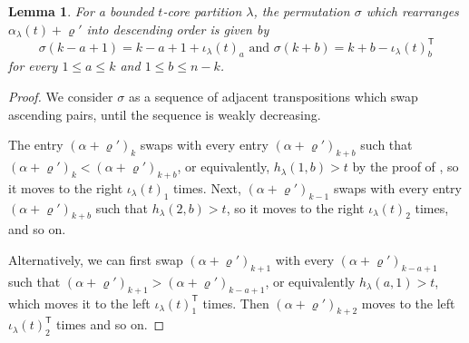 \documentclass{amsart}
\newcommand\T{\mathsf{T}}
\theoremstyle{plain}
\newtheorem{lemma}[lemma]{Lemma}
\theoremstyle{definition}
\numberwithin{equation}{section}
\begin{document}
\begin{lemma}\label{lem:sigma}
For a bounded $t$-core partition $\lambda$, the permutation $\sigma$ which rearranges $\alpha_\lambda(t)+\varrho'$ into descending order is given by
\[\sigma(k-a+1)=k-a+1+\iota_\lambda(t)_a\text{ and }\sigma(k+b)=k+b-\iota_\lambda(t)_b^\T\]
for every $1\leq a\leq k$ and $1\leq b\leq n-k$.
\end{lemma}

\begin{proof}
We consider $\sigma$ as a sequence of adjacent transpositions which swap ascending pairs, until the sequence is weakly decreasing. 

The entry $(\alpha+\varrho')_{k}$ swaps with every entry $(\alpha+\varrho')_{k+b}$ such that $(\alpha+\varrho')_{k}<(\alpha+\varrho')_{k+b}$, or equivalently, $h_\lambda(1,b)>t$ by the proof of , so it moves to the right $\iota_\lambda(t)_1$ times. Next, $(\alpha+\varrho')_{k-1}$ swaps with every entry $(\alpha+\varrho')_{k+b}$ such that $h_\lambda(2,b)>t$, so it moves to the right $\iota_\lambda(t)_2$ times, and so on.

Alternatively, we can first swap $(\alpha+\varrho')_{k+1}$ with every $(\alpha+\varrho')_{k-a+1}$ such that $(\alpha+\varrho')_{k+1}>(\alpha+\varrho')_{k-a+1}$, or equivalently $h_\lambda(a,1)>t$, which moves it to the left $\iota_\lambda(t)_1^\T$ times. Then $(\alpha+\varrho')_{k+2}$ moves to the left $\iota_\lambda(t)_2^\T$ times and so on.
\end{proof}
\end{document}
